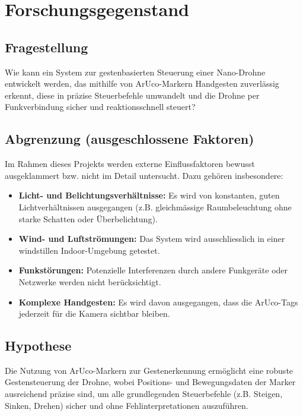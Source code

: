 \section{Forschungsgegenstand}
\subsection{Fragestellung}
Wie kann ein System zur gestenbasierten Steuerung einer Nano-Drohne entwickelt werden, das mithilfe von ArUco-Markern Handgesten zuverlässig erkennt, diese in präzise Steuerbefehle umwandelt und die Drohne per  Funkverbindung sicher und reaktionsschnell steuert?

\subsection{Abgrenzung (ausgeschlossene Faktoren)}
Im Rahmen dieses Projekts werden externe Einflussfaktoren bewusst ausgeklammert bzw. nicht im Detail untersucht.
Dazu gehören insbesondere:
\begin{itemize}
  \item \textbf{Licht- und Belichtungsverhältnisse:} Es wird von konstanten, guten Lichtverhältnissen ausgegangen (z.B. gleichmässige Raumbeleuchtung ohne starke Schatten oder Überbelichtung).
  \item \textbf{Wind- und Luftströmungen:} Das System wird ausschliesslich in einer windstillen Indoor-Umgebung getestet.
  \item \textbf{Funkstörungen:} Potenzielle Interferenzen durch andere Funkgeräte oder Netzwerke werden nicht berücksichtigt.
  \item \textbf{Komplexe Handgesten:} Es wird davon ausgegangen, dass die ArUco-Tags jederzeit für die Kamera sichtbar bleiben.
\end{itemize}

\subsection{Hypothese}
Die Nutzung von ArUco-Markern zur Gestenerkennung ermöglicht eine robuste Gestensteuerung der Drohne, wobei Positions- und Bewegungsdaten der Marker ausreichend präzise sind, um alle grundlegenden Steuerbefehle (z.B. Steigen, Sinken, Drehen) sicher und ohne Fehlinterpretationen auszuführen.

\endgroup